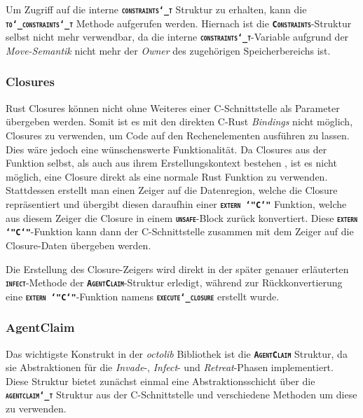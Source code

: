 Um Zugriff auf die interne \texttt{\textsc{\textbf{constraints\char`_t}}} Struktur zu erhalten, kann die \\
\texttt{\textsc{\textbf{to\char`_constraints\char`_t}}} Methode aufgerufen werden.
Hiernach ist die \texttt{\textsc{\textbf{Constraints}}}-Struktur selbst nicht mehr verwendbar,
da die interne \texttt{\textsc{\textbf{constraints\char`_t}}}-Variable aufgrund der \textit{Move-Semantik}
nicht mehr der \textit{Owner} des zugehörigen Speicherbereichs ist.

\subsubsection{Closures}

Rust Closures können nicht ohne Weiteres einer C-Schnittstelle als Parameter übergeben werden.
Somit ist es mit den direkten C-Rust \textit{Bindings} nicht möglich, Closures zu verwenden,
um Code auf den Rechenelementen ausführen zu lassen. Dies wäre jedoch eine
wünschenswerte Funktionalität. Da Closures aus der Funktion selbst, als auch aus ihrem
Erstellungskontext bestehen \cite{embeddedRustOS}, ist es nicht möglich,
eine Closure direkt als eine normale Rust Funktion zu verwenden.
Stattdessen erstellt man einen Zeiger auf die Datenregion,
welche die Closure repräsentiert und übergibt diesen daraufhin einer
\texttt{\textsc{\textbf{extern \char`"C\char`"}}} Funktion, welche aus diesem Zeiger die Closure in einem
\texttt{\textsc{\textbf{unsafe}}}-Block zurück konvertiert.
Diese \texttt{\textsc{\textbf{extern \char`"C\char`"}}}-Funktion kann dann der C-Schnittstelle zusammen mit dem
Zeiger auf die Closure-Daten übergeben werden.

Die Erstellung des Closure-Zeigers wird direkt in der später genauer erläuterten
\texttt{\textsc{\textbf{infect}}}-Methode der \texttt{\textsc{\textbf{AgentClaim}}}-Struktur
erledigt, während zur Rückkonvertierung eine \texttt{\textsc{\textbf{extern \char`"C\char`"}}}-Funktion namens \texttt{\textsc{\textbf{execute\char`_closure}}} erstellt wurde.

\subsubsection{AgentClaim}

Das wichtigste Konstrukt in der \textit{octolib} Bibliothek ist die \texttt{\textsc{\textbf{AgentClaim}}} Struktur,
da sie Abstraktionen für die \textit{Invade}-, \textit{Infect}- und \textit{Retreat}-Phasen implementiert.
Diese Struktur bietet zunächst einmal eine Abstraktionsschicht über die \texttt{\textsc{\textbf{agentclaim\char`_t}}}
Struktur aus der C-Schnittstelle und verschiedene Methoden um diese zu verwenden.


